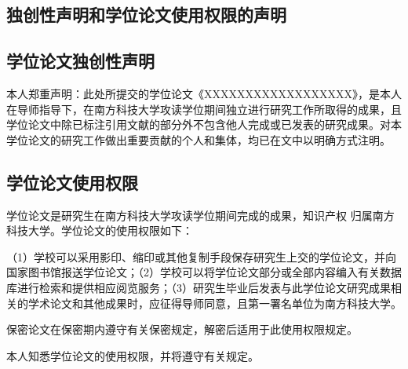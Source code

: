 \begin{statementcopyright}
  \chapter{独创性声明和学位论文使用权限的声明}
  \section*{学位论文独创性声明}

  本人郑重声明：此处所提交的学位论文《XXXXXXXXXXXXXXXXXX》，是本人在导师指导下，在南方科技大学攻读学位期间独立进行研究工作所取得的成果，且学位论文中除已标注引用文献的部分外不包含他人完成或已发表的研究成果。对本学位论文的研究工作做出重要贡献的个人和集体，均已在文中以明确方式注明。
  
  \authorsign
  
  \section*{学位论文使用权限}
  
  学位论文是研究生在南方科技大学攻读学位期间完成的成果，知识产权
  归属南方科技大学。学位论文的使用权限如下：
  
  （1）学校可以采用影印、缩印或其他复制手段保存研究生上交的学位论文，并向国家图书馆报送学位论文；（2）学校可以将学位论文部分或全部内容编入有关数据库进行检索和提供相应阅览服务；（3）研究生毕业后发表与此学位论文研究成果相关的学术论文和其他成果时，应征得导师同意，且第一署名单位为南方科技大学。
  
  保密论文在保密期内遵守有关保密规定，解密后适用于此使用权限规定。
  
  本人知悉学位论文的使用权限，并将遵守有关规定。
  
  \authorsupervisorsign
  
\end{statementcopyright}